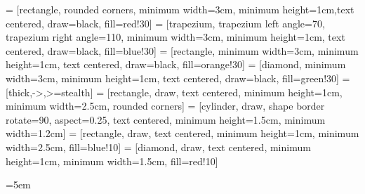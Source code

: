 \usepackage{titlesec}
\usepackage{tikz}
\usetikzlibrary{shapes.geometric, arrows, positioning, calc, er, fit}
 = [rectangle, rounded corners, minimum width=3cm, minimum height=1cm,text centered, draw=black, fill=red!30]
 = [trapezium, trapezium left angle=70, trapezium right angle=110, minimum width=3cm, minimum height=1cm, text centered, draw=black, fill=blue!30]
 = [rectangle, minimum width=3cm, minimum height=1cm, text centered, draw=black, fill=orange!30]
 = [diamond, minimum width=3cm, minimum height=1cm, text centered, draw=black, fill=green!30]
 = [thick,->,>=stealth]
 = [rectangle, draw, text centered, minimum height=1cm, minimum width=2.5cm, rounded corners]
 = [cylinder, draw, shape border rotate=90, aspect=0.25, text centered, minimum height=1.5cm, minimum width=1.2cm]
 = [rectangle, draw, text centered, minimum height=1cm, minimum width=2.5cm, fill=blue!10]
 = [diamond, draw, text centered, minimum height=1cm, minimum width=1.5cm, fill=red!10]

\emergencystretch=5em %
\titleformat{\chapter}{\bfseries\centering}{\thechapter}{1em}{}
\titleformat{\section}{\bfseries}{\thesection}{1em}{}
\titleformat{\subsection}{\bfseries}{\thesubsection}{1em}{}
\titleformat{\subsubsection}{\bfseries}{\thesubsubsection}{1em}{}


